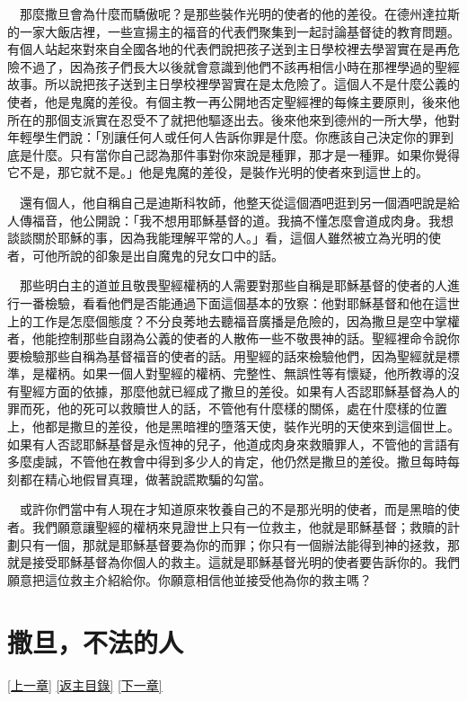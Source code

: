 \documentclass{book}
\begin{document}
　那麼撒旦會為什麼而驕傲呢？是那些裝作光明的使者的他的差役。在德州達拉斯的一家大飯店裡，一些宣揚主的福音的代表們聚集到一起討論基督徒的教育問題。有個人站起來對來自全國各地的代表們說把孩子送到主日學校裡去學習實在是再危險不過了，因為孩子們長大以後就會意識到他們不該再相信小時在那裡學過的聖經故事。所以說把孩子送到主日學校裡學習實在是太危險了。這個人不是什麼公義的使者，他是鬼魔的差役。有個主教一再公開地否定聖經裡的每條主要原則，後來他所在的那個支派實在忍受不了就把他驅逐出去。後來他來到德州的一所大學，他對年輕學生們說：「別讓任何人或任何人告訴你罪是什麼。你應該自己決定你的罪到底是什麼。只有當你自己認為那件事對你來說是種罪，那才是一種罪。如果你覺得它不是，那它就不是。」他是鬼魔的差役，是裝作光明的使者來到這世上的。

　還有個人，他自稱自己是迪斯科牧師，他整天從這個酒吧逛到另一個酒吧說是給人傳福音，他公開說：「我不想用耶穌基督的道。我搞不懂怎麼會道成肉身。我想談談關於耶穌的事，因為我能理解平常的人。」看，這個人雖然被立為光明的使者，可他所說的卻象是出自魔鬼的兒女口中的話。

　那些明白主的道並且敬畏聖經權柄的人需要對那些自稱是耶穌基督的使者的人進行一番檢驗，看看他們是否能通過下面這個基本的攷察：他對耶穌基督和他在這世上的工作是怎麼個態度？不分良莠地去聽福音廣播是危險的，因為撒旦是空中掌權者，他能控制那些自詡為公義的使者的人散佈一些不敬畏神的話。聖經裡命令說你要檢驗那些自稱為基督福音的使者的話。用聖經的話來檢驗他們，因為聖經就是標準，是權柄。如果一個人對聖經的權柄、完整性、無誤性等有懷疑，他所教導的沒有聖經方面的依據，那麼他就已經成了撒旦的差役。如果有人否認耶穌基督為人的罪而死，他的死可以救贖世人的話，不管他有什麼樣的關係，處在什麼樣的位置上，他都是撒旦的差役，他是黑暗裡的墮落天使，裝作光明的天使來到這個世上。如果有人否認耶穌基督是永恆神的兒子，他道成肉身來救贖罪人，不管他的言語有多麼虔誠，不管他在教會中得到多少人的肯定，他仍然是撒旦的差役。撒旦每時每刻都在精心地假冒真理，做著說謊欺騙的勾當。

　或許你們當中有人現在才知道原來牧養自己的不是那光明的使者，而是黑暗的使者。我們願意讓聖經的權柄來見證世上只有一位救主，他就是耶穌基督；救贖的計劃只有一個，那就是耶穌基督要為你的而罪；你只有一個辦法能得到神的拯救，那就是接受耶穌基督為你個人的救主。這就是耶穌基督光明的使者要告訴你的。我們願意把這位救主介紹給你。你願意相信他並接受他為你的救主嗎？

\chapter{撒旦，不法的人}
\label{sec:ch08}
\hyperref[sec:ch07]{[上一章]}
\hyperlink{toc}{[返主目錄]}
\hyperref[sec:ch09]{[下一章]}
\end{document}
